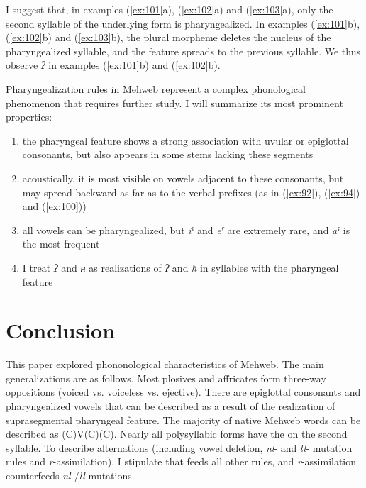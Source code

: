 \documentclass[output=paper]{langsci/langscibook}
\begin{document}
I suggest that, in examples (\ref{ex:101}a), (\ref{ex:102}a) and (\ref{ex:103}a), only the second
syllable of the underlying form is pharyngealized. In examples (\ref{ex:101}b),
(\ref{ex:102}b) and (\ref{ex:103}b), the plural morpheme deletes the nucleus of the
pharyngealized syllable, and the feature spreads to the previous
syllable. We thus observe \emph{ʡ} in examples (\ref{ex:101}b) and (\ref{ex:102}b).

Pharyngealization rules in Mehweb represent a complex phonological
phenomenon that requires further study. I will summarize its most
prominent properties:
\begin{enumerate}[topsep=\medskipamount,itemsep=0pt,partopsep=0pt,parsep=0pt]
\def\labelenumi{\arabic{enumi})}
\item
 the pharyngeal feature shows a strong association with uvular or
 epiglottal consonants, but also appears in some stems lacking these
 segments
\item
 acoustically, it is most visible on vowels adjacent to these
 consonants, but may spread backward as far as to the verbal prefixes
 (as in (\ref{ex:92}), (\ref{ex:94}) and (\ref{ex:100}))
\item
 all vowels can be pharyngealized, but \emph{iˤ} and \emph{eˤ} are
 extremely rare, and \emph{aˤ} is the most frequent
\item
 I treat \emph{ʡ} and \emph{ʜ} as realizations of \emph{ʔ} and \emph{ħ}
 in syllables with the pharyngeal feature
\end{enumerate}

\section{Conclusion}\label{conclusion}

This paper explored phononological characteristics of Mehweb. The main
generalizations are as follows. Most plosives and affricates form
three-way oppositions (voiced vs. voiceless vs. ejective). There are
epiglottal consonants and pharyngealized vowels that can be described as
a result of the realization of suprasegmental pharyngeal feature.
The majority of native Mehweb words can be
described as (C)V(C)(C). Nearly all polysyllabic forms have the 
on the second syllable. To describe alternations (including vowel
deletion, \emph{nl}- and \emph{ll}- mutation rules and
\emph{r}-assimilation), I stipulate that  feeds all other
rules, and \emph{r}-assimilation counterfeeds \emph{nl-}/\emph{ll}-mutations.
\end{document}
